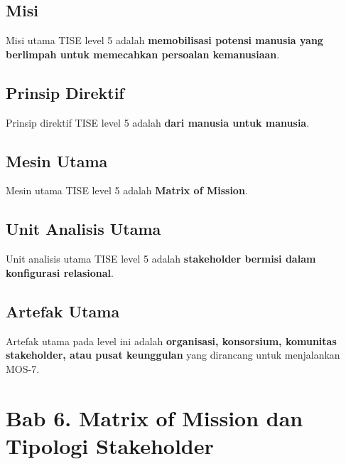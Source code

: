 \documentclass[
  letterpaper,
  DIV=11,
  numbers=noendperiod]{scrreprt}
\begin{document}
\section*{Misi}\label{misi}


Misi utama TISE level 5 adalah \textbf{memobilisasi potensi manusia yang
berlimpah untuk memecahkan persoalan kemanusiaan}.

\section*{Prinsip Direktif}\label{prinsip-direktif}


Prinsip direktif TISE level 5 adalah \textbf{dari manusia untuk
manusia}.

\section*{Mesin Utama}\label{mesin-utama}


Mesin utama TISE level 5 adalah \textbf{Matrix of Mission}.

\section*{Unit Analisis Utama}\label{unit-analisis-utama}


Unit analisis utama TISE level 5 adalah \textbf{stakeholder bermisi
dalam konfigurasi relasional}.

\section*{Artefak Utama}\label{artefak-utama}


Artefak utama pada level ini adalah \textbf{organisasi, konsorsium,
komunitas stakeholder, atau pusat keunggulan} yang dirancang untuk
menjalankan MOS-7.


\chapter*{Bab 6. Matrix of Mission dan Tipologi
Stakeholder}\label{bab-6.-matrix-of-mission-dan-tipologi-stakeholder}
\end{document}
